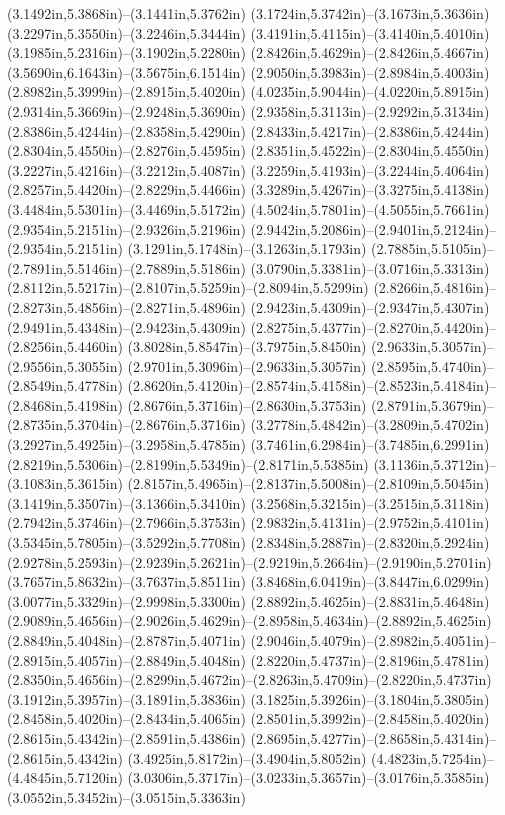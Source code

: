 (3.1492in,5.3868in)--(3.1441in,5.3762in) (3.1724in,5.3742in)--(3.1673in,5.3636in) (3.2297in,5.3550in)--(3.2246in,5.3444in) (3.4191in,5.4115in)--(3.4140in,5.4010in) (3.1985in,5.2316in)--(3.1902in,5.2280in) (2.8426in,5.4629in)--(2.8426in,5.4667in) (3.5690in,6.1643in)--(3.5675in,6.1514in) (2.9050in,5.3983in)--(2.8984in,5.4003in) (2.8982in,5.3999in)--(2.8915in,5.4020in) (4.0235in,5.9044in)--(4.0220in,5.8915in) (2.9314in,5.3669in)--(2.9248in,5.3690in) (2.9358in,5.3113in)--(2.9292in,5.3134in) (2.8386in,5.4244in)--(2.8358in,5.4290in) (2.8433in,5.4217in)--(2.8386in,5.4244in) (2.8304in,5.4550in)--(2.8276in,5.4595in) (2.8351in,5.4522in)--(2.8304in,5.4550in) (3.2227in,5.4216in)--(3.2212in,5.4087in) (3.2259in,5.4193in)--(3.2244in,5.4064in) (2.8257in,5.4420in)--(2.8229in,5.4466in) (3.3289in,5.4267in)--(3.3275in,5.4138in) (3.4484in,5.5301in)--(3.4469in,5.5172in) (4.5024in,5.7801in)--(4.5055in,5.7661in) (2.9354in,5.2151in)--(2.9326in,5.2196in) (2.9442in,5.2086in)--(2.9401in,5.2124in)--(2.9354in,5.2151in) (3.1291in,5.1748in)--(3.1263in,5.1793in) (2.7885in,5.5105in)--(2.7891in,5.5146in)--(2.7889in,5.5186in) (3.0790in,5.3381in)--(3.0716in,5.3313in) (2.8112in,5.5217in)--(2.8107in,5.5259in)--(2.8094in,5.5299in) (2.8266in,5.4816in)--(2.8273in,5.4856in)--(2.8271in,5.4896in) (2.9423in,5.4309in)--(2.9347in,5.4307in) (2.9491in,5.4348in)--(2.9423in,5.4309in) (2.8275in,5.4377in)--(2.8270in,5.4420in)--(2.8256in,5.4460in) (3.8028in,5.8547in)--(3.7975in,5.8450in) (2.9633in,5.3057in)--(2.9556in,5.3055in) (2.9701in,5.3096in)--(2.9633in,5.3057in) (2.8595in,5.4740in)--(2.8549in,5.4778in) (2.8620in,5.4120in)--(2.8574in,5.4158in)--(2.8523in,5.4184in)--(2.8468in,5.4198in) (2.8676in,5.3716in)--(2.8630in,5.3753in) (2.8791in,5.3679in)--(2.8735in,5.3704in)--(2.8676in,5.3716in) (3.2778in,5.4842in)--(3.2809in,5.4702in) (3.2927in,5.4925in)--(3.2958in,5.4785in) (3.7461in,6.2984in)--(3.7485in,6.2991in) (2.8219in,5.5306in)--(2.8199in,5.5349in)--(2.8171in,5.5385in) (3.1136in,5.3712in)--(3.1083in,5.3615in) (2.8157in,5.4965in)--(2.8137in,5.5008in)--(2.8109in,5.5045in) (3.1419in,5.3507in)--(3.1366in,5.3410in) (3.2568in,5.3215in)--(3.2515in,5.3118in) (2.7942in,5.3746in)--(2.7966in,5.3753in) (2.9832in,5.4131in)--(2.9752in,5.4101in) (3.5345in,5.7805in)--(3.5292in,5.7708in) (2.8348in,5.2887in)--(2.8320in,5.2924in) (2.9278in,5.2593in)--(2.9239in,5.2621in)--(2.9219in,5.2664in)--(2.9190in,5.2701in) (3.7657in,5.8632in)--(3.7637in,5.8511in) (3.8468in,6.0419in)--(3.8447in,6.0299in) (3.0077in,5.3329in)--(2.9998in,5.3300in) (2.8892in,5.4625in)--(2.8831in,5.4648in) (2.9089in,5.4656in)--(2.9026in,5.4629in)--(2.8958in,5.4634in)--(2.8892in,5.4625in) (2.8849in,5.4048in)--(2.8787in,5.4071in) (2.9046in,5.4079in)--(2.8982in,5.4051in)--(2.8915in,5.4057in)--(2.8849in,5.4048in) (2.8220in,5.4737in)--(2.8196in,5.4781in) (2.8350in,5.4656in)--(2.8299in,5.4672in)--(2.8263in,5.4709in)--(2.8220in,5.4737in) (3.1912in,5.3957in)--(3.1891in,5.3836in) (3.1825in,5.3926in)--(3.1804in,5.3805in) (2.8458in,5.4020in)--(2.8434in,5.4065in) (2.8501in,5.3992in)--(2.8458in,5.4020in) (2.8615in,5.4342in)--(2.8591in,5.4386in) (2.8695in,5.4277in)--(2.8658in,5.4314in)--(2.8615in,5.4342in) (3.4925in,5.8172in)--(3.4904in,5.8052in) (4.4823in,5.7254in)--(4.4845in,5.7120in) (3.0306in,5.3717in)--(3.0233in,5.3657in)--(3.0176in,5.3585in) (3.0552in,5.3452in)--(3.0515in,5.3363in) 